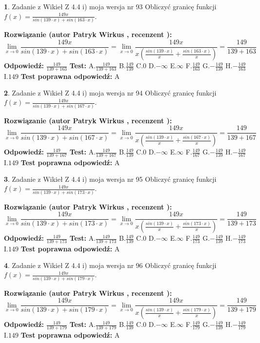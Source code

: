 \documentclass[12pt, a4paper]{article}
\theoremstyle{definition} %
\newtheorem{zad}{}
\newcommand{\zadStart}[1]{\begin{zad}#1\newline}
\newcommand{\zadStop}{\end{zad}}
\newcommand{\rozwStart}[2]{\noindent \textbf{Rozwiązanie (autor #1 , recenzent #2): }\newline}
\newcommand{\rozwStop}{\newline}
\newcommand{\odpStart}{\noindent \textbf{Odpowiedź:}\newline}
\newcommand{\odpStop}{\newline}
\newcommand{\testStart}{\noindent \textbf{Test:}\newline}
\newcommand{\testStop}{\newline}
\newcommand{\kluczStart}{\noindent \textbf{Test poprawna odpowiedź:}\newline}
\newcommand{\kluczStop}{\newline}
\begin{document}
\zadStart{Zadanie z Wikieł Z 4.4 i) moja wersja nr 93}
Obliczyć granicę funkcji $f(x)=\frac{149x}{sin(139\cdot x) +sin(163\cdot x)}$.
\zadStop
\rozwStart{Patryk Wirkus}{}
$$\lim\limits_{x\to 0}\frac{149x}{sin(139\cdot x) +sin(163\cdot x)}=\lim\limits_{x\to 0}\frac{149x}{x(\frac{sin(139\cdot x)}{x}+\frac{sin(163\cdot x)}{x})}=\frac{149}{139+163}$$
\rozwStop
\odpStart
$\frac{149}{139+163}$
\odpStop
\testStart
A.$\frac{149}{139+163}$
B.$\frac{149}{139}$
C.$0$
D.$-\infty$
E.$\infty$
F.$\frac{149}{163}$
G.$-\frac{149}{139}$
H.$-\frac{149}{163}$
I.$149$
\testStop
\kluczStart
A
\kluczStop



\zadStart{Zadanie z Wikieł Z 4.4 i) moja wersja nr 94}
Obliczyć granicę funkcji $f(x)=\frac{149x}{sin(139\cdot x) +sin(167\cdot x)}$.
\zadStop
\rozwStart{Patryk Wirkus}{}
$$\lim\limits_{x\to 0}\frac{149x}{sin(139\cdot x) +sin(167\cdot x)}=\lim\limits_{x\to 0}\frac{149x}{x(\frac{sin(139\cdot x)}{x}+\frac{sin(167\cdot x)}{x})}=\frac{149}{139+167}$$
\rozwStop
\odpStart
$\frac{149}{139+167}$
\odpStop
\testStart
A.$\frac{149}{139+167}$
B.$\frac{149}{139}$
C.$0$
D.$-\infty$
E.$\infty$
F.$\frac{149}{167}$
G.$-\frac{149}{139}$
H.$-\frac{149}{167}$
I.$149$
\testStop
\kluczStart
A
\kluczStop



\zadStart{Zadanie z Wikieł Z 4.4 i) moja wersja nr 95}
Obliczyć granicę funkcji $f(x)=\frac{149x}{sin(139\cdot x) +sin(173\cdot x)}$.
\zadStop
\rozwStart{Patryk Wirkus}{}
$$\lim\limits_{x\to 0}\frac{149x}{sin(139\cdot x) +sin(173\cdot x)}=\lim\limits_{x\to 0}\frac{149x}{x(\frac{sin(139\cdot x)}{x}+\frac{sin(173\cdot x)}{x})}=\frac{149}{139+173}$$
\rozwStop
\odpStart
$\frac{149}{139+173}$
\odpStop
\testStart
A.$\frac{149}{139+173}$
B.$\frac{149}{139}$
C.$0$
D.$-\infty$
E.$\infty$
F.$\frac{149}{173}$
G.$-\frac{149}{139}$
H.$-\frac{149}{173}$
I.$149$
\testStop
\kluczStart
A
\kluczStop



\zadStart{Zadanie z Wikieł Z 4.4 i) moja wersja nr 96}
Obliczyć granicę funkcji $f(x)=\frac{149x}{sin(139\cdot x) +sin(179\cdot x)}$.
\zadStop
\rozwStart{Patryk Wirkus}{}
$$\lim\limits_{x\to 0}\frac{149x}{sin(139\cdot x) +sin(179\cdot x)}=\lim\limits_{x\to 0}\frac{149x}{x(\frac{sin(139\cdot x)}{x}+\frac{sin(179\cdot x)}{x})}=\frac{149}{139+179}$$
\rozwStop
\odpStart
$\frac{149}{139+179}$
\odpStop
\testStart
A.$\frac{149}{139+179}$
B.$\frac{149}{139}$
C.$0$
D.$-\infty$
E.$\infty$
F.$\frac{149}{179}$
G.$-\frac{149}{139}$
H.$-\frac{149}{179}$
I.$149$
\testStop
\kluczStart
A
\kluczStop
\end{document}
